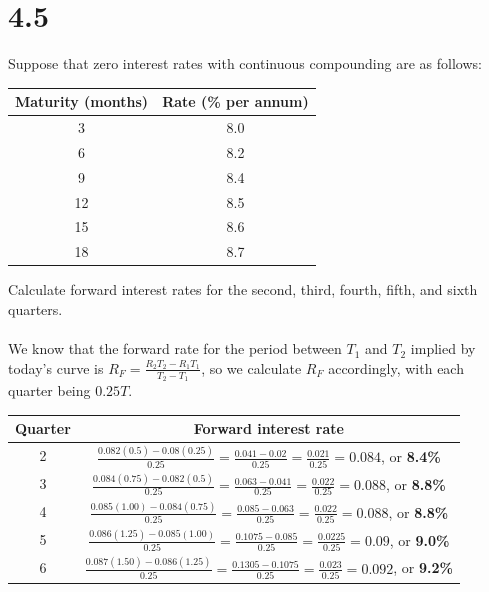 \documentclass{article}
\begin{document}
\thispagestyle{firstpageheader}
{\Large 

\section*{4.5}

Suppose that zero interest rates with continuous compounding are as follows:
\begin{center}
\begin{tabular}{ |c|c| } 
 \hline
 Maturity (months) & Rate (\% per annum) \\ 
 \hline
 3 & 8.0 \\ 
 \hline
 6 & 8.2 \\ 
 \hline
 9 & 8.4 \\ 
 \hline
 12 & 8.5 \\ 
 \hline
 15 & 8.6 \\ 
 \hline
 18 & 8.7 \\ 
 \hline
\end{tabular}
\end{center}
Calculate forward interest rates for the second, third, fourth, fifth, and sixth quarters. \\ \\
We know that the forward rate for the period between \(T_1\) and \(T_2\) implied by today's curve is \(R_F = \frac{R_2 T_2 - R_1 T_1}{T_2 - T_1}\), so we calculate \(R_F\) accordingly, with each quarter being \(0.25T\).

\begin{center}
\begin{tabular}{ |c|c| } 
 \hline
 Quarter & Forward interest rate \\ 
 \hline
 2 & \(\frac{0.082(0.5) - 0.08(0.25)}{0.25} = \frac{0.041 - 0.02}{0.25} = \frac{0.021}{0.25} = 0.084\), or \textbf{8.4\%} \\ 
 \hline
 3 & \(\frac{0.084(0.75) - 0.082(0.5)}{0.25} = \frac{0.063 - 0.041}{0.25} = \frac{0.022}{0.25} = 0.088\), or \textbf{8.8\%} \\ 
 \hline
 4 & \(\frac{0.085(1.00) - 0.084(0.75)}{0.25} = \frac{0.085 - 0.063}{0.25} = \frac{0.022}{0.25} =  0.088\), or \textbf{8.8\%} \\ 
 \hline
 5 & \(\frac{0.086(1.25) - 0.085(1.00)}{0.25} = \frac{0.1075 - 0.085}{0.25} = \frac{0.0225}{0.25} = 0.09\), or \textbf{9.0\%} \\ 
 \hline
 6 & \(\frac{0.087(1.50) - 0.086(1.25)}{0.25} = \frac{0.1305 - 0.1075}{0.25} = \frac{0.023}{0.25} = 0.092\), or \textbf{9.2\%} \\ 
\hline
\end{tabular}
\end{center}

}
\end{document}
